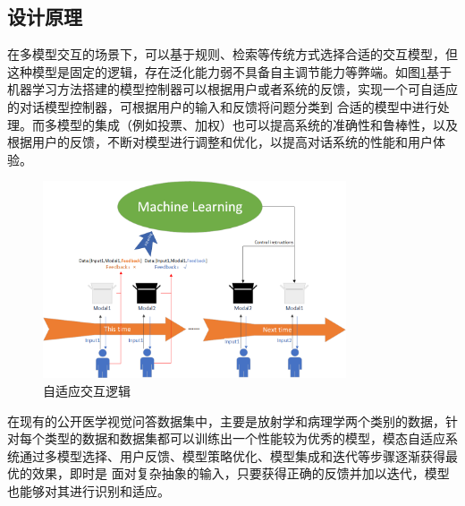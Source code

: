 \subsection{设计原理}
在多模型交互的场景下，可以基于规则、检索等传统方式选择合适的交互模型，但这种模型是固定的逻辑，存在泛化能力弱不具备自主调节能力等弊端。如图\ref{comu_logit}基于机器学习方法搭建的模型控制器可以根据用户或者系统的反馈，实现一个可自适应的对话模型控制器，可根据用户的输入和反馈将问题分类到
合适的模型中进行处理。而多模型的集成（例如投票、加权）也可以提高系统的准确性和鲁棒性，以及根据用户的反馈，不断对模型进行调整和优化，以提高对话系统的性能和用户体验。

\begin{figure}[htbp]
	\centering	
	\includegraphics[width=0.8\textwidth]{Fig/myfig/chapter5/comu_logit.png}  %
	\caption{\label{comu_logit}自适应交互逻辑} 
\end{figure}

在现有的公开医学视觉问答数据集中，主要是放射学和病理学两个类别的数据，针对每个类型的数据和数据集都可以训练出一个性能较为优秀的模型，模态自适应系统通过多模型选择、用户反馈、模型策略优化、模型集成和迭代等步骤逐渐获得最优的效果，即时是
面对复杂抽象的输入，只要获得正确的反馈并加以迭代，模型也能够对其进行识别和适应。

